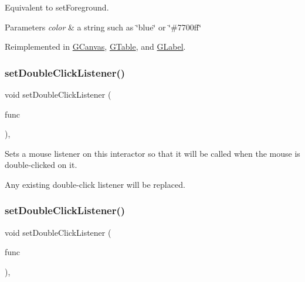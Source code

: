 Equivalent to set\+Foreground. 
\begin{DoxyParams}{Parameters}
{\em color} & a string such as \char`\"{}blue\char`\"{} or \char`\"{}\#7700ff\char`\"{} \\
\hline
\end{DoxyParams}


Reimplemented in \mbox{\hyperlink{classsgl_1_1GCanvas_a56845b1accc47aa881d05939eef6996c}{G\+Canvas}}, \mbox{\hyperlink{classsgl_1_1GTable_a56845b1accc47aa881d05939eef6996c}{G\+Table}}, and \mbox{\hyperlink{classsgl_1_1GLabel_a56845b1accc47aa881d05939eef6996c}{G\+Label}}.

\mbox{\label{classsgl_1_1GInteractor_ac29f9a3462458e165fae3a1f046ee77a}} 
\subsubsection{\texorpdfstring{set\+Double\+Click\+Listener()}{setDoubleClickListener()}\hspace{0.1cm}{\footnotesize\ttfamily [1/2]}}
{\footnotesize\ttfamily void set\+Double\+Click\+Listener (\begin{DoxyParamCaption}\item[{\mbox{\hyperlink{namespacesgl_ae9f3e9eab70035da1a2b114e21357b25}{G\+Event\+Listener}}}]{func }\end{DoxyParamCaption})\hspace{0.3cm}{\ttfamily [virtual]}, {\ttfamily [inherited]}}



Sets a mouse listener on this interactor so that it will be called when the mouse is double-\/clicked on it. 

Any existing double-\/click listener will be replaced. \mbox{\label{classsgl_1_1GInteractor_a50096194d66f48c92dd4c512d41bfc76}} 
\subsubsection{\texorpdfstring{set\+Double\+Click\+Listener()}{setDoubleClickListener()}\hspace{0.1cm}{\footnotesize\ttfamily [2/2]}}
{\footnotesize\ttfamily void set\+Double\+Click\+Listener (\begin{DoxyParamCaption}\item[{\mbox{\hyperlink{namespacesgl_a54427ce97bb1c2804e4fe2b0a62e8b17}{G\+Event\+Listener\+Void}}}]{func }\end{DoxyParamCaption})\hspace{0.3cm}{\ttfamily [virtual]}, {\ttfamily [inherited]}}



